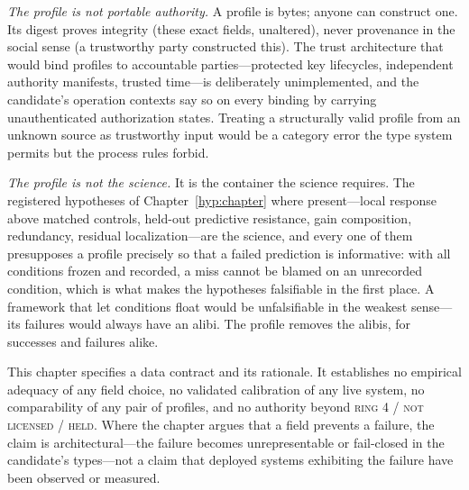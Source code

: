 \emph{The profile is not portable authority.} A profile is bytes; anyone can
construct one. Its digest proves integrity (these exact fields, unaltered),
never provenance in the social sense (a trustworthy party constructed
this). The trust architecture that would bind profiles to accountable
parties---protected key lifecycles, independent authority manifests,
trusted time---is deliberately unimplemented, and the candidate's operation
contexts say so on every binding by carrying unauthenticated authorization
states. Treating a structurally valid profile from an unknown source as
trustworthy input would be a category error the type system permits but the
process rules forbid.

\emph{The profile is not the science.} It is the container the science
requires. The registered hypotheses of
Chapter~\ref{hyp:chapter} where present---local response above matched
controls, held-out predictive resistance, gain composition, redundancy,
residual localization---are the science, and every one of them presupposes a
profile precisely so that a failed prediction is informative: with all
conditions frozen and recorded, a miss cannot be blamed on an unrecorded
condition, which is what makes the hypotheses falsifiable in the first
place. A framework that let conditions float would be unfalsifiable in the
weakest sense---its failures would always have an alibi. The profile
removes the alibis, for successes and failures alike.

\begin{boundary}\label{ch05:bound}
This chapter specifies a data contract and its rationale. It establishes no
empirical adequacy of any field choice, no validated calibration of any live
system, no comparability of any pair of profiles, and no authority beyond
\textsc{ring 4 / not licensed / held}. Where the chapter argues that a field
prevents a failure, the claim is architectural---the failure becomes
unrepresentable or fail-closed in the candidate's types---not a claim that
deployed systems exhibiting the failure have been observed or measured.
\end{boundary}
